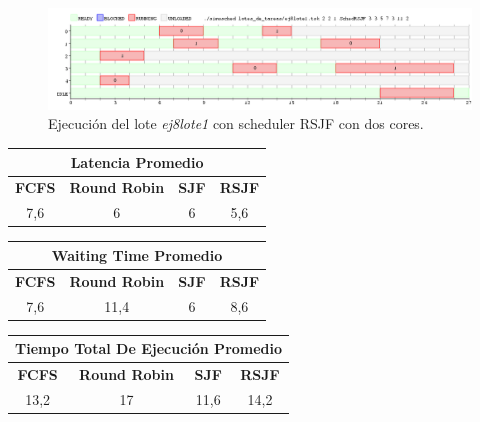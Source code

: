 \begin{figure}[!h]
	\begin{center}
		\includegraphics[width=500px]{imagenes/ej8_prueba1_rsjf2.png}
		\caption{Ejecución del lote \emph{ej8lote1} con scheduler RSJF con dos cores.}
		\label{fig:grafico_ej8_prueba1_rsjf2}
	\end{center}
\end{figure}

\begin{center}
	\begin{tabular}{|c|c|c|c|}
		\hline
		\multicolumn{4}{|c|}{\large{\textbf{Latencia Promedio}}} \\
		\hline
		\textbf{FCFS} & \textbf{Round Robin} & \textbf{SJF} & \textbf{RSJF} \\
		\hline
		7,6 & 6 & 6 & 5,6 \\
		\hline
	\end{tabular}
\end{center}

\begin{center}
	\begin{tabular}{|c|c|c|c|}
		\hline
		\multicolumn{4}{|c|}{\large{\textbf{Waiting Time Promedio}}} \\
		\hline
		\textbf{FCFS} & \textbf{Round Robin} & \textbf{SJF} & \textbf{RSJF} \\
		\hline
		7,6 & 11,4 & 6 & 8,6 \\
		\hline
	\end{tabular}
\end{center}

\begin{center}
	\begin{tabular}{|c|c|c|c|}
		\hline
		\multicolumn{4}{|c|}{\large{\textbf{Tiempo Total De Ejecución Promedio}}} \\
		\hline
		\textbf{FCFS} & \textbf{Round Robin} & \textbf{SJF} & \textbf{RSJF} \\
		\hline
		13,2 & 17 & 11,6 & 14,2 \\
		\hline
	\end{tabular}
\end{center}

